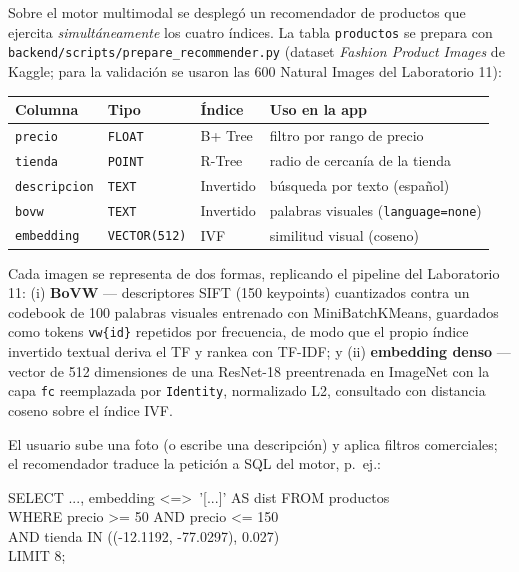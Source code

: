 \documentclass[11pt]{article}
\begin{document}
Sobre el motor multimodal se desplegó un recomendador de productos que
ejercita \emph{simultáneamente} los cuatro índices. La tabla
\texttt{productos} se prepara con
\texttt{backend/scripts/prepare\_recommender.py} (dataset \emph{Fashion
Product Images} de Kaggle; para la validación se usaron las 600 Natural
Images del Laboratorio 11):

\begin{center}
\small
\begin{tabular}{@{}llll@{}}
\toprule
\rowcolor{utecblue!10}\textbf{Columna} & \textbf{Tipo} & \textbf{Índice} & \textbf{Uso en la app} \\
\midrule
\texttt{precio}      & \texttt{FLOAT}      & B+ Tree   & filtro por rango de precio \\
\texttt{tienda}      & \texttt{POINT}      & R-Tree    & radio de cercanía de la tienda \\
\texttt{descripcion} & \texttt{TEXT}       & Invertido & búsqueda por texto (español) \\
\texttt{bovw}        & \texttt{TEXT}       & Invertido & palabras visuales (\texttt{language=none}) \\
\texttt{embedding}   & \texttt{VECTOR(512)} & IVF      & similitud visual (coseno) \\
\bottomrule
\end{tabular}
\end{center}

Cada imagen se representa de dos formas, replicando el pipeline del
Laboratorio 11: (i) \textbf{BoVW} --- descriptores SIFT (150 keypoints)
cuantizados contra un codebook de 100 palabras visuales entrenado con
MiniBatchKMeans, guardados como tokens \texttt{vw\{id\}} repetidos por
frecuencia, de modo que el propio índice invertido textual deriva el TF y
rankea con TF-IDF; y (ii) \textbf{embedding denso} --- vector de 512
dimensiones de una ResNet-18 preentrenada en ImageNet con la capa
\texttt{fc} reemplazada por \texttt{Identity}, normalizado L2, consultado
con distancia coseno sobre el índice IVF.

El usuario sube una foto (o escribe una descripción) y aplica filtros
comerciales; el recomendador traduce la petición a SQL del motor, p.~ej.:

\begin{cajaformato}
SELECT ..., embedding \textless=\textgreater\ '[...]' AS dist FROM productos\\
WHERE precio >= 50 AND precio <= 150\\
\hspace*{1em}AND tienda IN ((-12.1192, -77.0297), 0.027)\\
LIMIT 8;
\end{cajaformato}
\end{document}
